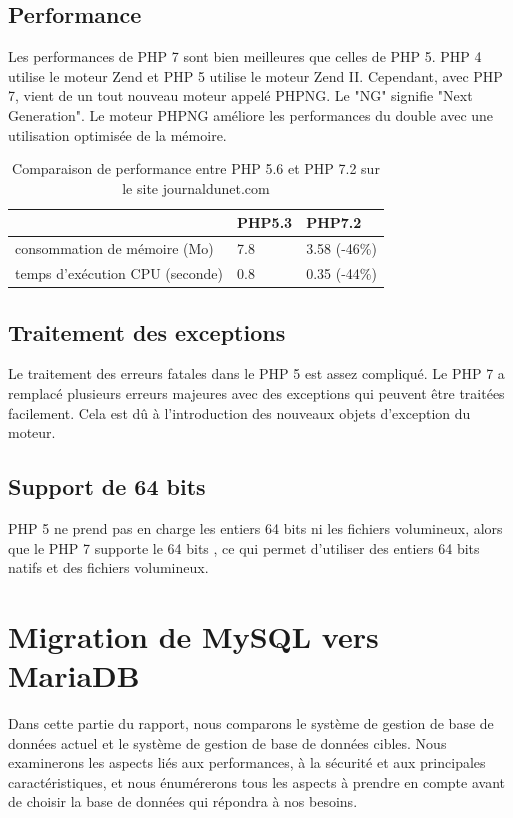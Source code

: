 \subsection[Performance]{Performance}
Les performances de PHP 7 sont bien meilleures que celles de PHP 5. PHP 4 utilise le moteur Zend et PHP 5 utilise le moteur Zend II. Cependant, avec PHP 7, vient de un tout nouveau moteur appelé PHPNG. Le "NG" signifie "Next Generation". Le moteur PHPNG améliore les performances du double avec une utilisation optimisée de la mémoire.
\begin{table}[H]
	\centering
	\begin{tabular}{l|l|l|}
		\cline{2-3}
		& \cellcolor[HTML]{C0C0C0}PHP5.3 & \cellcolor[HTML]{C0C0C0}PHP7.2 \\ \hline
		\multicolumn{1}{|l|}{\cellcolor[HTML]{C0C0C0}consommation de mémoire (Mo)}    & 7.8                            & 3.58 (-46\%)                   \\ \hline
		\multicolumn{1}{|l|}{\cellcolor[HTML]{C0C0C0}temps d'exécution CPU (seconde)} & 0.8                            & 0.35 (-44\%)                   \\ \hline
	\end{tabular}
\captionsetup{justification=centering}
	\caption{Comparaison de performance entre PHP 5.6 et PHP 7.2 sur le site journaldunet.com\cite{php-perf} }
	\label{tab:perf-php}
\end{table}
\subsection[Traitement des exceptions]{Traitement des exceptions}
Le traitement des erreurs \cite{php-quora} fatales dans le PHP 5 est assez compliqué. Le PHP 7 a remplacé plusieurs erreurs majeures avec des exceptions qui peuvent être traitées facilement. Cela est dû à l'introduction des nouveaux objets d'exception du moteur.
\subsection[Support de 64 bits ]{Support de 64 bits}
PHP 5 ne prend pas en charge les entiers 64 bits ni les fichiers volumineux, alors que le PHP 7 supporte le 64 bits \cite{php-quora}, ce qui permet d'utiliser des entiers 64 bits natifs et des fichiers volumineux.
\section[Migration de MySQL vers MariaDB]{Migration de MySQL vers MariaDB}
Dans cette partie du rapport, nous comparons le système de gestion de base de données actuel et le système de gestion de base de données cibles. Nous examinerons les aspects liés aux performances, à la sécurité et aux principales caractéristiques, et nous énumérerons tous les aspects à prendre en compte avant de choisir la base de données qui répondra à nos besoins.
